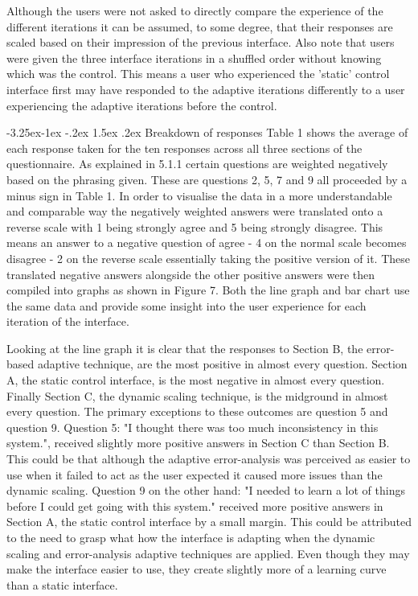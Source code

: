 \documentclass[12pt]{article}
\makeatletter
\renewcommand{\subsubsection}{\@startsection{subsubsection}{2}{\z@}%
             {-3.25ex\@plus -1ex \@minus -.2ex}%
             {1.5ex \@plus .2ex}%
             {\normalfont\normalsize\scshape\bfseries}}
\makeatother
\begin{document}
Although the users were not asked to directly compare the experience of the different iterations it can be assumed, to some degree, that their responses are scaled based on their impression of the previous interface. Also note that users were given the three interface iterations in a shuffled order without knowing which was the control. This means a user who experienced the 'static' control interface first may have responded to the adaptive iterations differently to a user experiencing the adaptive iterations before the control.

\subsubsection{Breakdown of responses}
Table 1 shows the average of each response taken for the ten responses across all three sections of the questionnaire. As explained in 5.1.1 certain questions are weighted negatively based on the phrasing given. These are questions 2, 5, 7 and 9 all proceeded by a minus sign in Table 1. In order to visualise the data in a more understandable and comparable way the negatively weighted answers were translated onto a reverse scale with 1 being strongly agree and 5 being strongly disagree. This means an answer to a negative question of agree - 4 on the normal scale becomes disagree - 2 on the reverse scale essentially taking the positive version of it. These translated negative answers alongside the other positive answers were then compiled into graphs as shown in Figure 7. Both the line graph and bar chart use the same data and provide some insight into the user experience for each iteration of the interface.

Looking at the line graph it is clear that the responses to Section B, the error-based adaptive technique, are the most positive in almost every question. Section A, the static control interface, is the most negative in almost every question. Finally Section C, the dynamic scaling technique, is the midground in almost every question. The primary exceptions to these outcomes are question 5 and  question 9. Question 5: "I thought there was too much inconsistency in this system.", received slightly more positive answers in Section C than Section B. This could be that although the adaptive error-analysis was perceived as easier to use when it failed to act as the user expected it caused more issues than the dynamic scaling. Question 9 on the other hand: "I needed to learn a lot of things before I could get going with this system." received more positive answers in Section A, the static control interface by a small margin. This could be attributed to the need to grasp what how the interface is adapting when the dynamic scaling and error-analysis adaptive techniques are applied. Even though they may make the interface easier to use, they create slightly more of a learning curve than a static interface.
\end{document}

